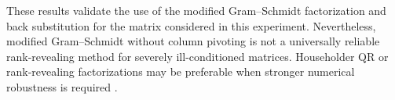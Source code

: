 These results validate the use of the modified Gram--Schmidt
factorization and back substitution for the matrix considered in
this experiment. Nevertheless, modified Gram--Schmidt without
column pivoting is not a universally reliable rank-revealing
method for severely ill-conditioned matrices. Householder QR
or rank-revealing factorizations may be preferable when stronger
numerical robustness is required
\cite{golub2013matrix,higham2002accuracy}.